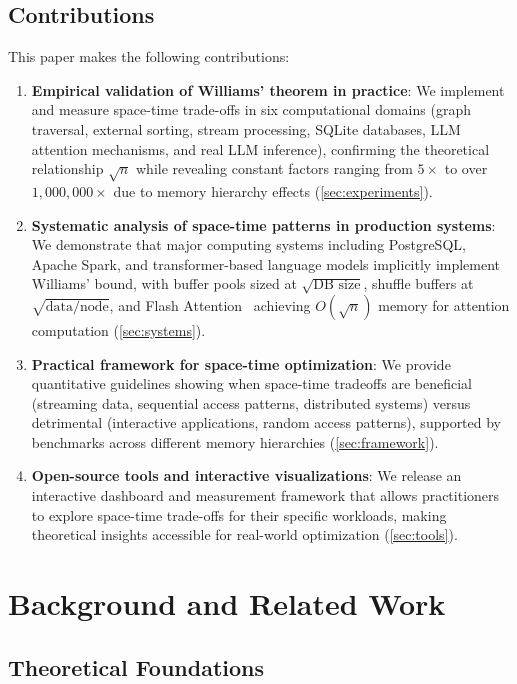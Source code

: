 \documentclass[11pt]{article}
\theoremstyle{definition}
\begin{document}
\subsection{Contributions}

This paper makes the following contributions:

\begin{enumerate}
\item \textbf{Empirical validation of Williams' theorem in practice}: We implement and measure space-time trade-offs in six computational domains (graph traversal, external sorting, stream processing, SQLite databases, LLM attention mechanisms, and real LLM inference), confirming the theoretical relationship $\sqrt{n}$ while revealing constant factors ranging from $5\times$ to over $1{,}000{,}000\times$ due to memory hierarchy effects (\cref{sec:experiments}).

\item \textbf{Systematic analysis of space-time patterns in production systems}: We demonstrate that major computing systems including PostgreSQL, Apache Spark, and transformer-based language models implicitly implement Williams' bound, with buffer pools sized at $\sqrt{\text{DB size}}$, shuffle buffers at $\sqrt{\text{data/node}}$, and Flash Attention~\cite{flashattention2022} achieving $O(\sqrt{n})$ memory for attention computation (\cref{sec:systems}).

\item \textbf{Practical framework for space-time optimization}: We provide quantitative guidelines showing when space-time tradeoffs are beneficial (streaming data, sequential access patterns, distributed systems) versus detrimental (interactive applications, random access patterns), supported by benchmarks across different memory hierarchies (\cref{sec:framework}).

\item \textbf{Open-source tools and interactive visualizations}: We release an interactive dashboard and measurement framework that allows practitioners to explore space-time trade-offs for their specific workloads, making theoretical insights accessible for real-world optimization (\cref{sec:tools}).
\end{enumerate}

\section{Background and Related Work}

\subsection{Theoretical Foundations}
\end{document}
